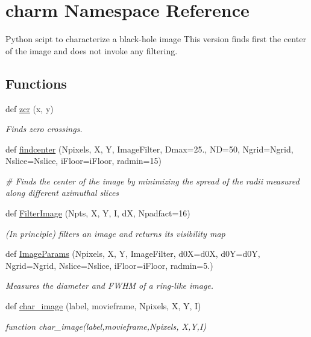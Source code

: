 \hypertarget{namespacecharm}{}\section{charm Namespace Reference}
\label{namespacecharm}


Python scipt to characterize a black-\/hole image This version finds first the center of the image and does not invoke any filtering.  


\subsection*{Functions}
\begin{DoxyCompactItemize}
\item 
def \mbox{\hyperlink{namespacecharm_a5607b264551d2edebff8f7491a53e838}{zcr}} (x, y)
\begin{DoxyCompactList}\small\item\em Finds zero crossings. \end{DoxyCompactList}\item 
def \mbox{\hyperlink{namespacecharm_a033b21f5f3466dba63640f1884bc0fb1}{findcenter}} (Npixels, X, Y, Image\+Filter, Dmax=25., ND=50, Ngrid=Ngrid, Nslice=Nslice, i\+Floor=i\+Floor, radmin=15)
\begin{DoxyCompactList}\small\item\em \# Finds the center of the image by minimizing the spread of the radii measured along different azimuthal slices \end{DoxyCompactList}\item 
def \mbox{\hyperlink{namespacecharm_a4361ade65d39e905f4fe1fbef2a6a152}{Filter\+Image}} (Npts, X, Y, I, dX, Npadfact=16)
\begin{DoxyCompactList}\small\item\em (In principle) filters an image and returns its visibility map \end{DoxyCompactList}\item 
def \mbox{\hyperlink{namespacecharm_ab4a4aecd11782c79b28e743b038894b6}{Image\+Params}} (Npixels, X, Y, Image\+Filter, d0X=d0X, d0Y=d0Y, Ngrid=Ngrid, Nslice=Nslice, i\+Floor=i\+Floor, radmin=5.)
\begin{DoxyCompactList}\small\item\em Measures the diameter and F\+W\+HM of a ring-\/like image. \end{DoxyCompactList}\item 
def \mbox{\hyperlink{namespacecharm_af661e8a1e79e9d287bbd932dfb08ad61}{char\+\_\+image}} (label, movieframe, Npixels, X, Y, I)
\begin{DoxyCompactList}\small\item\em function char\+\_\+image(label,movieframe,\+Npixels, X,\+Y,\+I) \end{DoxyCompactList}\end{DoxyCompactItemize}
